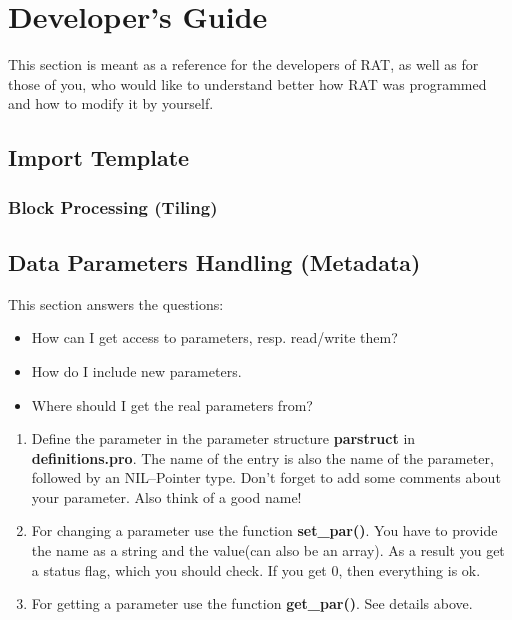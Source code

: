 \chapter{Developer's Guide}

This section is meant as a reference for the developers of RAT, as well as for
those of you, who would like to understand better how RAT was programmed and how
to modify it by yourself.


\section{Import Template}

\subsection{Block Processing (Tiling)}

\section{Data Parameters Handling (Metadata)}
This section answers the questions:
\begin{itemize}
  \item How can I get access to parameters, resp. read/write them?
  \item How do I include new parameters.
  \item Where should I get the real parameters from?
\end{itemize}

\begin{enumerate}
  \item Define the parameter in the parameter structure \textbf{parstruct} in
    \textbf{definitions.pro}. The name of the entry is also the name of the
    parameter, followed by an NIL--Pointer type. Don't forget to add some
    comments about your parameter. Also think of a good name!
  \item For changing a parameter use the function \textbf{set\_par()}. You have to
    provide the name as a string and the value(can also be an array). As a
    result you get a status flag, which you should check. If you get 0, then
    everything is ok.
  \item For getting a parameter use the function \textbf{get\_par()}. See details above.
\end{enumerate}


